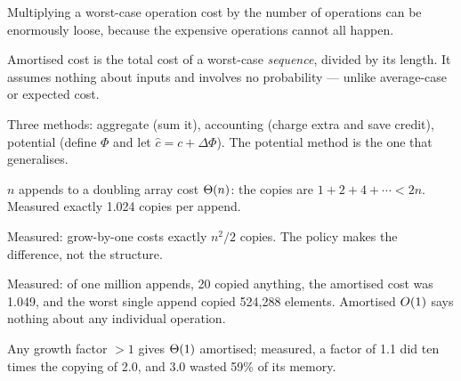 \begin{chaptersummary}
\begin{tight}
  \item Multiplying a worst-case operation cost by the number of operations can
        be enormously loose, because the expensive operations cannot all
        happen.
  \item Amortised cost is the total cost of a worst-case \emph{sequence},
        divided by its length. It assumes nothing about inputs and involves no
        probability --- unlike average-case or expected cost.
  \item Three methods: aggregate (sum it), accounting (charge extra and save
        credit), potential (define $\Phi$ and let $\hat c = c + \Delta\Phi$).
        The potential method is the one that generalises.
  \item $n$ appends to a doubling array cost $\Theta(n)$: the copies are
        $1+2+4+\cdots < 2n$. Measured exactly 1.024 copies per append.
  \item Measured: grow-by-one costs exactly $n^{2}/2$ copies. The policy makes
        the difference, not the structure.
  \item Measured: of one million appends, 20 copied anything, the amortised
        cost was 1.049, and the worst single append copied 524{,}288 elements.
        Amortised $O(1)$ says nothing about any individual operation.
  \item Any growth factor $> 1$ gives $\Theta(1)$ amortised; measured, a factor
        of 1.1 did ten times the copying of 2.0, and 3.0 wasted 59\% of its
        memory.
\end{tight}
\end{chaptersummary}

